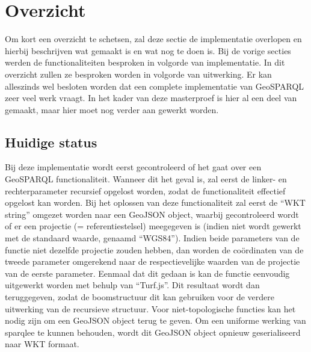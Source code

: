 \section{Overzicht}
\label{sec:impl_overzicht}
Om kort een overzicht te schetsen, zal deze sectie de implementatie overlopen en hierbij beschrijven wat gemaakt is en wat nog te doen is. Bij de vorige secties werden de functionaliteiten besproken in volgorde van implementatie. In dit overzicht zullen ze besproken worden in volgorde van uitwerking. Er kan alleszinds wel besloten worden dat een complete implementatie van GeoSPARQL zeer veel werk vraagt. In het kader van deze masterproef is hier al een deel van gemaakt, maar hier moet nog verder aan gewerkt worden.

\subsection{Huidige status}
Bij deze implementatie wordt eerst gecontroleerd of het gaat over een GeoSPARQL functionaliteit. Wanneer dit het geval is, zal eerst de linker- en rechterparameter recursief opgelost worden, zodat de functionaliteit effectief opgelost kan worden. Bij het oplossen van deze functionaliteit zal eerst de ``WKT string'' omgezet worden naar een GeoJSON object, waarbij gecontroleerd wordt of er een projectie (= referentiestelsel) meegegeven is (indien niet wordt gewerkt met de standaard waarde, genaamd ``WGS84''). Indien beide parameters van de functie niet dezelfde projectie zouden hebben, dan worden de coördinaten van de tweede parameter omgerekend naar de respectievelijke waarden van de projectie van de eerste parameter. Eenmaal dat dit gedaan is kan de functie eenvoudig uitgewerkt worden met behulp van ``Turf.js''. Dit resultaat wordt dan teruggegeven, zodat de boomstructuur dit kan gebruiken voor de verdere uitwerking van de recursieve structuur. Voor niet-topologische functies kan het nodig zijn om een GeoJSON object terug te geven. Om een uniforme werking van sparqlee te kunnen behouden, wordt dit GeoJSON object opnieuw geserialiseerd naar WKT formaat. 

